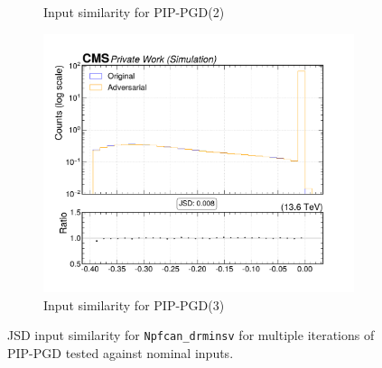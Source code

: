 \begin{figure}[htbp]
\begin{subfigure}[t]{0.32\textwidth}
    \caption*{Input similarity for PIP-PGD(2)}
  \end{subfigure}\hfill
  \begin{subfigure}[t]{0.32\textwidth}
    \includegraphics[width=\linewidth]{media/output/features/compare/combined_it_3/cmp_npf_arr_Npfcan_drminsv.pdf}
    \caption*{Input similarity for PIP-PGD(3)}
  \end{subfigure}

  \caption*{JSD input similarity for \texttt{Npfcan\_drminsv} for multiple iterations of PIP-PGD tested against nominal inputs.}
  \label{fig:combined_input_Npfcan_drminsv}
\end{figure}

